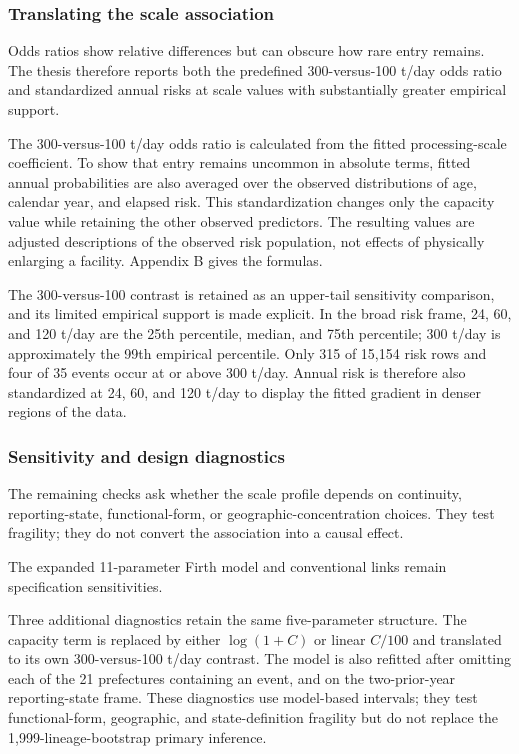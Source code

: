 \documentclass[12pt,letterpaper]{article}
\begin{document}
\subsubsection{Translating the scale association}

Odds ratios show relative differences but can obscure how rare entry remains.
The thesis therefore reports both the predefined 300-versus-100 t/day
odds ratio and standardized annual risks at scale values with substantially
greater empirical support.

The 300-versus-100 t/day odds ratio is calculated from the fitted processing-scale coefficient. To show that entry remains uncommon in absolute terms, fitted annual probabilities are also averaged over the observed distributions of age, calendar year, and elapsed risk. This standardization changes only the capacity value while retaining the other observed predictors. The resulting values are adjusted descriptions of the observed risk population, not effects of physically enlarging a facility. Appendix B gives the formulas.

The 300-versus-100 contrast is retained as an upper-tail sensitivity comparison, and its limited empirical support is made explicit. In the broad risk frame, 24,
60, and 120 t/day are the 25th percentile, median, and 75th percentile; 300
t/day is approximately the 99th empirical percentile. Only 315 of 15,154 risk
rows and four of 35 events occur at or above 300 t/day. Annual risk is therefore
also standardized at 24, 60, and 120 t/day to display the fitted gradient in
denser regions of the data.

\subsubsection{Sensitivity and design diagnostics}

The remaining checks ask whether the scale profile depends on continuity,
reporting-state, functional-form, or geographic-concentration choices. They
test fragility; they do not convert the association into a causal effect.

The expanded 11-parameter Firth model and conventional links remain
specification sensitivities.

Three additional diagnostics retain the same five-parameter structure. The
capacity term is replaced by either $\log(1+C)$ or linear $C/100$ and translated
to its own 300-versus-100 t/day contrast. The model is also refitted after
omitting each of the 21 prefectures containing an event, and on the
two-prior-year reporting-state frame. These diagnostics use model-based
intervals; they test functional-form, geographic, and state-definition fragility
but do not replace the 1,999-lineage-bootstrap primary inference.
\end{document}
